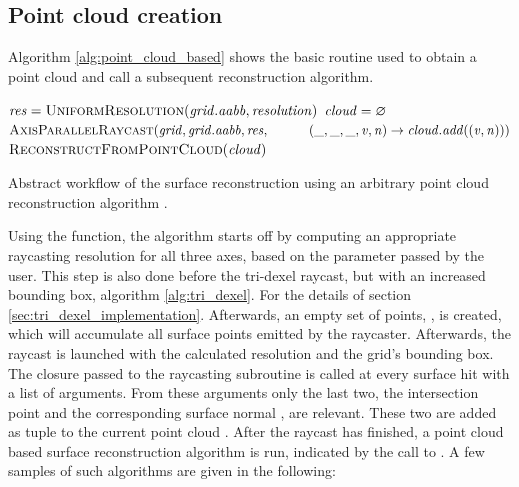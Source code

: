 \subsection{Point cloud creation}
\label{sec:point_cloud_creation}

Algorithm \ref{alg:point_cloud_based} shows the basic routine used to obtain a point cloud and call a subsequent reconstruction algorithm.
%
\begin{algorithm}
	\centering
	\begin{algorithmic}[1]
			\State $\var{res} = \Call{UniformResolution}{\var{grid}.\var{aabb}, \var{resolution}}$
			\State $\mathit{cloud} = \varnothing$
			\State $\Call{AxisParallelRaycast}{\var{grid}, \var{grid}.\var{aabb}, \var{res},\hfill\break
				\hspace*{\dimexpr\algorithmicindent*2}(\var{\_}, \var{\_}, \var{\_}, \var{v}, \var{n}) \rightarrow \var{cloud}.\var{add}((\var{v}, \var{n}))}$
			\State \Return $\Call{ReconstructFromPointCloud}{\var{cloud}}$
		\EndFunction
	\end{algorithmic}
	\caption{
		Abstract workflow of the surface reconstruction using an arbitrary point cloud reconstruction algorithm .
	}
	\label{alg:point_cloud_based}
\end{algorithm}
%
Using the  function, the algorithm starts off by computing an appropriate raycasting resolution  for all three axes, based on the  parameter passed by the user.
This step is also done before the tri-dexel raycast, but with an increased bounding box, \cf algorithm \ref{alg:tri_dexel}.
For the details of  \cf section \ref{sec:tri_dexel_implementation}.
Afterwards, an empty set of points, , is created, which will accumulate all surface points emitted by the raycaster.
Afterwards, the raycast is launched with the calculated resolution and the grid's bounding box.
The closure passed to the raycasting subroutine  is called at every surface hit with a list of arguments.
From these arguments only the last two, the intersection point  and the corresponding surface normal , are relevant.
These two are added as tuple to the current point cloud .
After the raycast has finished, a point cloud based surface reconstruction algorithm is run, indicated by the call to .
A few samples of such algorithms are given in the following:

